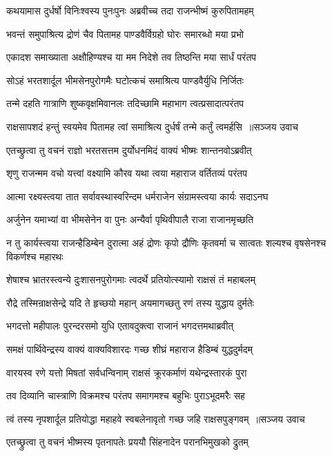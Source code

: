 \twolineshloka
{कथयामास दुर्धर्षो विनिःश्वस्य पुनःपुनः}
{अब्रवीच्च तदा राजन्भीष्मं कुरुपितामहम्}


\twolineshloka
{भवन्तं समुपाश्रित्य द्रोणं चैव पितामह}
{पाण्डवैर्विग्रहो घोरः समारब्धो मया प्रभो}


\twolineshloka
{एकादश समाख्याता अक्षौहिण्यश्च या मम}
{निदेशे तव तिष्ठन्ति मया सार्धं परंतप}


\twolineshloka
{सोऽहं भरतशार्दूल भीमसेनपुरोगमैः}
{घटोत्कचं समाश्रित्य पाण्डवैर्युधि निर्जितः}


\twolineshloka
{तन्मे दहति गात्राणि शुष्कवृक्षमिवानलः}
{तदिच्छामि महाभाग त्वत्प्रसादात्परंतप}


\threelineshloka
{राक्षसापशदं हन्तुं स्वयमेव पितामह}
{त्वां समाश्रित्य दुर्धर्षं तन्मे कर्तुं त्वमर्हसि ॥सञ्जय उवाच}
{}


\twolineshloka
{एतच्छ्रुत्वा तु वचनं राज्ञो भरतसत्तम}
{दुर्योधनमिदं वाक्यं भीष्मः शान्तनवोऽब्रवीत्}


\twolineshloka
{शृणु राजन्मम वचो यत्त्वां वक्ष्यामि कौरव}
{यथा त्वया महाराज वर्तितव्यं परंतप}


\twolineshloka
{आत्मा रक्ष्यस्त्वया तात सर्वावस्थास्वरिन्दम}
{धर्मराजेन संग्रामस्त्वया कार्यः सदाऽनघ}


\twolineshloka
{अर्जुनेन यमाभ्यां वा भीमसेनेन वा पुनः}
{अन्यैर्वा पृथिवीपालै राजा राजानमृच्छति}


\threelineshloka
{न तु कार्यस्त्वया राजन्हैडिम्बेन दुरात्मा}
{अहं द्रोणः कृपो द्रौणिः कृतवर्मा च सात्वतः}
{शल्यश्च वृषसेनश्च विकर्णश्च महारथः}


\twolineshloka
{शेषाश्च भ्रातरस्त्वन्ये दुःशासनपुरोगमाः}
{त्वदर्थे प्रतियोत्स्यामो राक्षसं तं महाबलम्}


\twolineshloka
{रौद्रे तस्मिन्राक्षसेन्द्रे यदि ते हृच्छयो महान्}
{अयमागच्छतु रणं तस्य युद्धाय दुर्मतेः}


\twolineshloka
{भगदत्तो महीपालः पुरन्दरसमो युधि}
{एतावदुक्त्वा राजानं भगदत्तमथाब्रवीत्}


\twolineshloka
{समक्षं पार्थिवेन्द्रस्य वाक्यं वाक्यविशारदः}
{गच्छ शीघ्रं महाराज हैडिम्बं युद्धदुर्मदम्}


\twolineshloka
{वारयस्व रणे यत्तो मिषतां सर्वधन्विनाम्}
{राक्षसं क्रूरकर्माणं यथेन्द्रस्तारकं पुरा}


\twolineshloka
{तव दिव्यानि चास्त्राणि विक्रमश्च परंतप}
{समागमश्च बहुभिः पुराऽभूदमरैः सह}


\threelineshloka
{त्वं तस्य नृपशार्दूल प्रतियोद्धा महाहवे}
{स्वबलेनावृतो गच्छ जहि राक्षसपुङ्गवम् ॥सञ्जय उवाच}
{}


\twolineshloka
{एतच्छ्रुत्वा तु वचनं भीष्मस्य पृतनापतेः}
{प्रययौ सिंहनादेन परानभिमुखको द्रुतम्}


